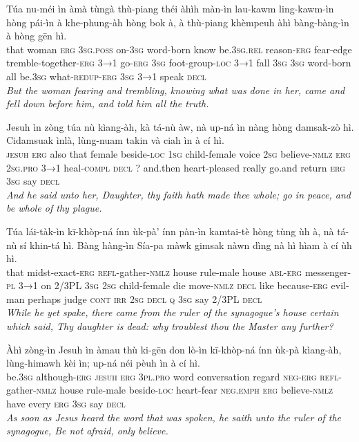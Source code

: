 \documentclass[11pt,a4paper]{article}
\begin{document}
\begin{exe}
\gll Túa nu-méi ìn àmà tùngà thù-piang théi àhìh màn-ìn lau-kawm ling-kawm-ìn hòng pái-ìn à khe-phung-àh hòng bok à, à thù-piang khèmpeuh àhì bàng-bàng-ìn à hòng gēn hì. \\
     that woman \textsc{erg} \textsc{3sg}.\textsc{poss} on-\textsc{3sg} word-born know be.\textsc{3sg}.\textsc{rel} reason-\textsc{erg} fear-edge tremble-together-\textsc{erg} \textsc{3→1} go-\textsc{erg} \textsc{3sg} foot-group-\textsc{loc} \textsc{3→1} fall \textsc{3sg} \textsc{3sg} word-born all be.\textsc{3sg} what-\textsc{redup}-\textsc{erg} \textsc{3sg} \textsc{3→1} speak \textsc{decl} \\
\glt \textcolor{kjvcolor}{\textit{But the woman fearing and trembling, knowing what was done in her, came and fell down before him, and told him all the truth.}}

\gll Jesuh ìn zòng túa nù kìang-àh, kà tá-nù àw, nà up-ná ìn nàng hòng damsak-zò hì. Cidamsuak ìnlà, lùng-nuam takin và ciah ìn à cí hì. \\
     \textsc{jesuh} \textsc{erg} also that female beside-\textsc{loc} \textsc{1sg} child-female voice \textsc{2sg} believe-\textsc{nmlz} \textsc{erg} \textsc{2sg}.\textsc{pro} \textsc{3→1} heal-\textsc{compl} \textsc{decl} ? and.then heart-pleased really go.and return \textsc{erg} \textsc{3sg} say \textsc{decl} \\
\glt \textcolor{kjvcolor}{\textit{And he said unto her, Daughter, thy faith hath made thee whole; go in peace, and be whole of thy plague.}}

\gll Túa lái-tàk-ìn kī-khòp-ná ínn ùk-pà' ínn pàn-ìn kamtai-tè hòng tùng ùh à, nà tá-nù sí khin-tá hì. Bàng hàng-ìn Sía-pa màwk gimsak nàwn dìng nà hì hìam à cí ùh hì. \\
     that midst-exact-\textsc{erg} \textsc{refl}-gather-\textsc{nmlz} house rule-male house \textsc{abl}-\textsc{erg} messenger-\textsc{pl} \textsc{3→1} on 2/3PL \textsc{3sg} \textsc{2sg} child-female die move-\textsc{nmlz} \textsc{decl} like because-\textsc{erg} evil-man perhaps judge \textsc{cont} \textsc{irr} \textsc{2sg} \textsc{decl} \textsc{q} \textsc{3sg} say 2/3PL \textsc{decl} \\
\glt \textcolor{kjvcolor}{\textit{While he yet spake, there came from the ruler of the synagogue's house certain which said, Thy daughter is dead: why troublest thou the Master any further?}}

\gll Àhì zòng-ìn Jesuh ìn àmau thù ki-gēn don lò-ìn kī-khòp-ná ínn ùk-pà kìang-àh, lùng-himawh kèi ìn; up-ná néi pèuh ìn à cí hì. \\
     be.\textsc{3sg} although-\textsc{erg} \textsc{jesuh} \textsc{erg} \textsc{3pl}.\textsc{pro} word conversation regard \textsc{neg}-\textsc{erg} \textsc{refl}-gather-\textsc{nmlz} house rule-male beside-\textsc{loc} heart-fear \textsc{neg}.\textsc{emph} \textsc{erg} believe-\textsc{nmlz} have every \textsc{erg} \textsc{3sg} say \textsc{decl} \\
\glt \textcolor{kjvcolor}{\textit{As soon as Jesus heard the word that was spoken, he saith unto the ruler of the synagogue, Be not afraid, only believe.}}


\end{exe}
\end{document}

